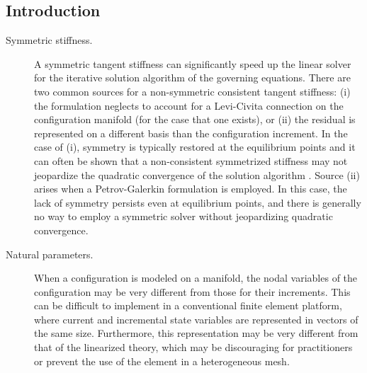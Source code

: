 \subsection{Introduction}
\begin{description}
%
  \item[Symmetric stiffness.] 
    A symmetric tangent stiffness can significantly speed up the linear solver
    for the iterative solution algorithm of the governing equations. %
    There are two 
    common sources for
    a non-symmetric consistent tangent stiffness:
    (i) the formulation neglects to account for a Levi-Civita connection on the configuration manifold (for the case that one exists), or 
    (ii) the residual is represented on a different basis than the configuration increment.
    In the case of (i), %
    symmetry is typically restored at the equilibrium points \citep{simo1986threedimensional} and it can often be shown that a non-consistent symmetrized stiffness may not jeopardize the quadratic convergence of the solution algorithm \citep{nour-omid1991finite}.
    Source (ii) arises
    when a Petrov-Galerkin formulation is employed. 
    In this case, the lack of symmetry persists even at equilibrium points, and there is generally no way to employ a symmetric solver without jeopardizing quadratic convergence. 
  
  \item[Natural parameters.]
    When a configuration is modeled on a manifold, the nodal variables of the configuration may be very different from 
    those for 
    their increments. 
    This can be difficult to implement in a conventional finite element platform, 
    where current and incremental state variables %
    are represented in vectors of %
    the same size.
    Furthermore, this representation may be very different from that of the linearized theory, 
    which
    may be discouraging for
    practitioners or 
    prevent %
    the use of the element in a heterogeneous mesh.


\end{description}

